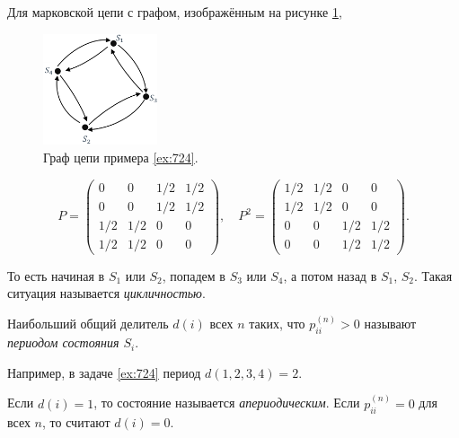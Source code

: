 \begin{ex}\label{ex:724}
  Для марковской цепи с графом, изображённым на рисунке \ref{fig:ex4},
  \begin{figure}[h!]
    \centering
    \includegraphics[width=0.3\textwidth]{stoproc/Figures/lec2-ex4.png}
    \caption{Граф цепи примера \ref{ex:724}.}
    \label{fig:ex4}
  \end{figure}
  \[
    P = \begin{pmatrix}
      0 & 0 & 1/2 & 1/2 \\
      0 & 0 & 1/2 & 1/2 \\
      1/2 & 1/2 & 0 & 0 \\
      1/2 & 1/2 & 0 & 0
    \end{pmatrix}, \quad
    P^2 = \begin{pmatrix}
      1/2 & 1/2 & 0 & 0 \\
      1/2 & 1/2 & 0 & 0 \\
      0 & 0 & 1/2 & 1/2 \\
      0 & 0 & 1/2 & 1/2
    \end{pmatrix}.
  \]

  То есть начиная в $S_1$ или $S_2$, попадем в $S_3$ или $S_4$, а потом назад в $S_1$, $S_2$.
Такая ситуация называется \emph{цикличностью}.
\end{ex}

\begin{definition}
  Наибольший общий делитель $ d(i) $ всех $ n $ таких, что $ p_{ii}^{(n)} > 0 $
  называют \emph{периодом состояния $ S_i $}.
\end{definition}
Например, в задаче \ref{ex:724} период $d(1, 2, 3, 4) = 2$.

\begin{definition}
  Если $d(i) = 1$, то состояние называется \emph{апериодическим}.
  Если $p_{ii}^{(n)} = 0$ для всех $n$, то считают $d(i) = 0$.
\end{definition}

